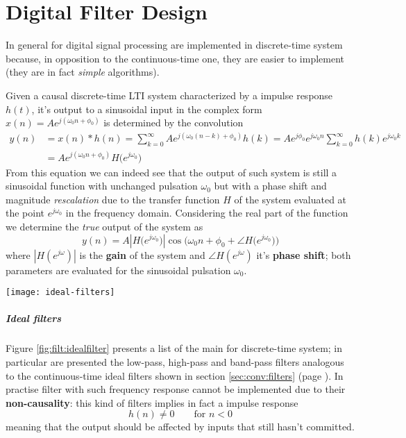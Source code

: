 \chapter{Digital Filter Design}
	In general  for digital signal processing are implemented in discrete-time system because, in opposition to the continuous-time one, they are easier to implement (they are in fact \textit{simple} algorithms).
	
	Given a causal discrete-time LTI system characterized by a impulse response $h(t)$, it's output to a sinusoidal input in the complex form $x(n) = A e^{j(\omega_0n+\phi_0)}$ is determined by the convolution
	\begin{equation} \label{eq:filt:shift}
	\begin{aligned} 
		y(n) & = x(n) * h(n) = \sum_{k=0}^\infty A e^{j(\omega_0(n-k)+\phi_0)}h(k) = Ae^{j\phi_0} e^{j\omega_0n} \sum_{k=0}^\infty h(k) e^{j\omega_0k} \\
		& = A e^{j(\omega_0n + \phi_0)}H\big(e^{j\omega_0}\big)
	\end{aligned}
	\end{equation}
	From this equation we can indeed see that the output of such system is still a sinusoidal function with unchanged pulsation $\omega_0$ but with a phase shift and magnitude \textit{rescalation} due to the transfer function $H$ of the system evaluated at the point $e^{j\omega_0}$ in the frequency domain. Considering the real part of the function we determine the \textit{true} output of the system as
	\[ y(n) = A \left| H\big(e^{j\omega_0}\big) \right| \cos\Big( \omega_0n + \phi_0 + \angle H\big(e^{j\omega_0}\big) \Big) \]
	where $|H(e^{j\omega})|$ is the \textbf{gain} of the system and $\angle H(e^{j\omega})$ it's \textbf{phase shift}; both parameters are evaluated for the sinusoidal pulsation $\omega_0$.	
	
	\begin{SCfigure}[2][bt]
		\centering \texttt{[image: ideal-filters]}
		\caption{examples of ideal filters in the frequency domain.}
		\label{fig:filt:idealfilter}
	\end{SCfigure}

	\paragraph{Ideal filters} Figure \ref{fig:filt:idealfilter} presents a list of the main  for discrete-time system; in particular are presented the low-pass, high-pass and band-pass filters analogous to the continuous-time ideal filters shown in section \ref{sec:conv:filters} (page \pageref{sec:conv:filters}). In practise filter with such frequency response cannot be implemented due to their \textbf{non-causality}: this kind of filters implies in fact a impulse response
	\[ h(n) \neq 0 \qquad \textrm{for } n < 0 \]
	meaning that the output should be affected by inputs that still hasn't committed.
	
